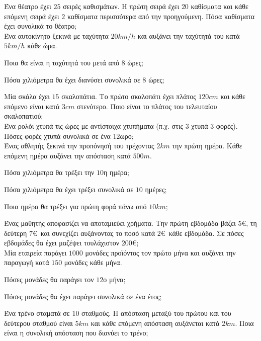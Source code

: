 \documentclass[11pt,a4paper,modern]{FFExercises}
\begin{document}
\askhsh Ένα θέατρο έχει $25$ σειρές καθισμάτων. Η πρώτη σειρά έχει $20$ καθίσματα και κάθε επόμενη σειρά έχει $2$ καθίσματα περισσότερα από την προηγούμενη. Πόσα καθίσματα έχει συνολικά το θέατρο;\\

\askhsh Ένα αυτοκίνητο ξεκινά με ταχύτητα $20\si{km/h}$ και αυξάνει την ταχύτητά του κατά $5\si{km/h}$ κάθε ώρα. 
\begin{alist}
\item Ποια θα είναι η ταχύτητά του μετά από $8$ ώρες;
\item Πόσα χιλιόμετρα θα έχει διανύσει συνολικά σε $8$ ώρες;
\end{alist}

\askhsh Μία σκάλα έχει $15$ σκαλοπάτια. Το πρώτο σκαλοπάτι έχει πλάτος $120\si{cm}$ και κάθε επόμενο είναι κατά $3\si{cm}$ στενότερο. Ποιο είναι το πλάτος του τελευταίου σκαλοπατιού;\\

\askhsh Ένα ρολόι χτυπά τις ώρες με αντίστοιχα χτυπήματα (π.χ. στις 3 χτυπά 3 φορές). Πόσες φορές χτυπά συνολικά σε ένα 12ωρο;\\

\askhsh Ένας αθλητής ξεκινά την προπόνησή του τρέχοντας $2\si{km}$ την πρώτη ημέρα. Κάθε επόμενη ημέρα αυξάνει την απόσταση κατά $500\si{m}$.
\begin{alist}
\item Πόσα χιλιόμετρα θα τρέξει την $10$η ημέρα;
\item Πόσα χιλιόμετρα θα έχει τρέξει συνολικά σε $10$ ημέρες;
\item Ποια ημέρα θα τρέξει για πρώτη φορά πάνω από $10\si{km}$;
\end{alist}

\askhsh Ένας μαθητής αποφασίζει να αποταμιεύει χρήματα. Την πρώτη εβδομάδα βάζει $5$\euro, τη δεύτερη $7$\euro\ και συνεχίζει αυξάνοντας το ποσό κατά $2$\euro\ κάθε εβδομάδα. Σε πόσες εβδομάδες θα έχει μαζέψει τουλάχιστον $200$\euro;\\

\askhsh Μία εταιρεία παράγει $1000$ μονάδες προϊόντος τον πρώτο μήνα και αυξάνει την παραγωγή κατά $150$ μονάδες κάθε μήνα. 
\begin{alist}
\item Πόσες μονάδες θα παράγει τον $12$ο μήνα;
\item Πόσες μονάδες θα έχει παράγει συνολικά σε ένα έτος;
\end{alist}

\askhsh Ένα τρένο σταματά σε $10$ σταθμούς. Η απόσταση μεταξύ του πρώτου και του δεύτερου σταθμού είναι $5\si{km}$ και κάθε επόμενη απόσταση αυξάνεται κατά $2\si{km}$. Ποια είναι η συνολική απόσταση που διανύει το τρένο;\\
\end{document}
